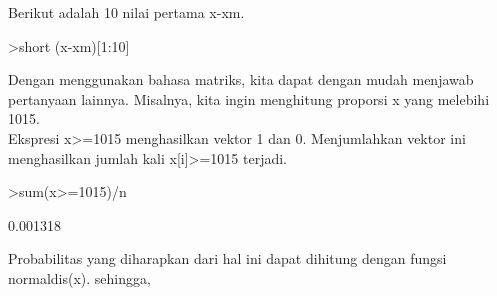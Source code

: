 \documentclass[a4paper,10pt]{article}
\begin{document}
\begin{eulernotebook}
\begin{eulercomment}
\begin{eulercomment}
\begin{eulercomment}
Berikut adalah 10 nilai pertama x-xm.
\end{eulercomment}
\begin{eulerprompt}
>short (x-xm)[1:10]
\end{eulerprompt}
\begin{euleroutput}
  [-6.0931,  -4.5526,  2.0616,  3.1487,  7.1846,  -0.38714,  -1.6464,
  -0.97655,  6.2287,  2.0015]
\end{euleroutput}
\begin{eulercomment}
Dengan menggunakan bahasa matriks, kita dapat dengan mudah menjawab
pertanyaan lainnya. Misalnya, kita ingin menghitung proporsi x yang
melebihi 1015.\\
Ekspresi x\textgreater{}=1015 menghasilkan vektor 1 dan 0. Menjumlahkan vektor ini
menghasilkan jumlah kali x[i]\textgreater{}=1015 terjadi.
\end{eulercomment}
\begin{eulerprompt}
>sum(x>=1015)/n
\end{eulerprompt}
\begin{euleroutput}
  0.001318
\end{euleroutput}
\begin{eulercomment}
Probabilitas yang diharapkan dari hal ini dapat dihitung dengan fungsi
normaldis(x). sehingga,


\end{eulercomment}
\end{eulercomment}
\end{eulercomment}
\end{eulernotebook}
\end{document}
